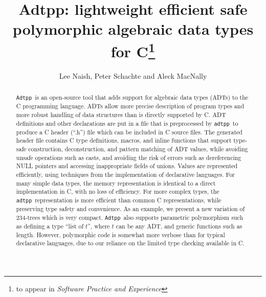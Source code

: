 \documentclass[times]{speauth}
\begin{document}
\newcommand{\adtpp}{\texttt{adtpp}}
\newcommand{\Adtpp}{\texttt{Adtpp}}

\title{Adtpp: lightweight efficient safe polymorphic algebraic data
types for C\footnote{to appear in \textit{Software Practice and Experience}}}
\author{Lee Naish, Peter Schachte and
Aleck MacNally}
\address{Computing and Information Systems, Universtity of
Melbourne}
\begin{abstract}

\Adtpp\ is an open-source tool that adds support for algebraic data types
(ADTs) to the C programming language.  ADTs allow more precise description
of program types and more robust handling of data structures than is
directly supported by C.  ADT definitions and other declarations are put
in a file that is preprocessed by \adtpp\ to produce a C header (``.h'')
file which can be included in C source files.  The generated header file
contains C type definitions, macros, and inline functions that support
type-safe construction, deconstruction, and pattern matching of ADT
values, while avoiding unsafe operations such as casts, and avoiding
the risk of errors such as dereferencing NULL pointers and accessing
inappropriate fields of unions.  Values are represented efficiently,
using techniques from the implementation of declarative languages.
For many simple data types, the memory representation is identical to a direct
implementation in C, with no loss of efficiency.  For more complex
types, the \adtpp\ representation is more efficient than common C
representations, while preserving type safety and convenience.  As an
example, we present a new variation of 234-trees which is very compact.
\Adtpp\ also supports parametric polymorphism such as defining a type
``list of $t$'', where $t$ can be any ADT, and generic functions
such as length.  However, polymorphic code is somewhat more verbose
than for typical declarative languages, due to our reliance on the
limited type checking available in C.

\end{abstract}
\maketitle





\end{document}
